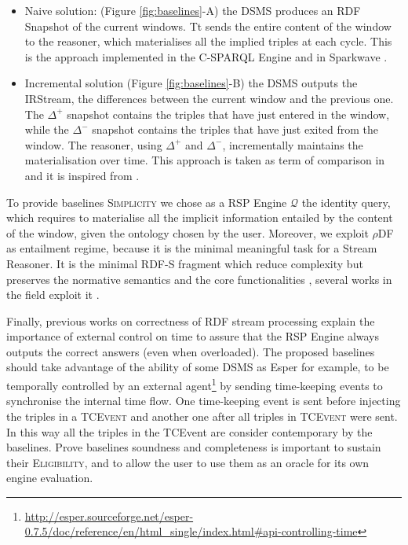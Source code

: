 \begin{itemize}
\item Naive solution: (Figure \ref{fig:baselines}-A) the DSMS produces an RDF Snapshot of the current windows. Tt sends the entire content of the window to the reasoner, which materialises all the implied triples at each cycle. This is the approach implemented in the C-SPARQL Engine \cite{DBLP:journals/sigmod/BarbieriBCVG10} and in Sparkwave \cite{DBLP:conf/debs/KomazecCF12}.
\item Incremental solution (Figure \ref{fig:baselines}-B) the DSMS outputs the IRStream, the differences between the current window and the previous one. The $\Delta^{+}$ snapshot contains the triples that have just entered in the window, while the $\Delta^{-}$ snapshot contains the triples that have just exited from the window. The reasoner, using $\Delta^{+}$ and $\Delta^{-}$, incrementally maintains the materialisation over time. This approach is taken as term of comparison in \cite{DellAglio2014} and it is inspired from \cite{DBLP:conf/cikm/RenP11}.
\end{itemize}

To provide baselines \textsc{Simplicity} we chose as a RSP Engine $\mathcal{Q}$ the identity query, which requires to materialise all the implicit information entailed by the content of the window, given the ontology chosen by the user. Moreover, we  exploit $\rho$DF as entailment regime, because it is the minimal meaningful task for a Stream Reasoner. It is the minimal RDF-S fragment which reduce complexity but preserves the normative semantics and the core functionalities \cite{DBLP:conf/esws/MunozPG07},  several works in the field exploit it  \cite{DBLP:conf/semweb/UrbaniMJHB13}.

Finally, previous works on correctness of RDF stream processing \cite{DBLP:conf/semweb/DellAglioCBCV13} explain the importance of external control on time to assure that the RSP Engine always outputs the correct answers (even when overloaded). The proposed baselines should take advantage of the ability of some DSMS as Esper for example, to be temporally controlled by an external agent\footnote{\url{http://esper.sourceforge.net/esper-0.7.5/doc/reference/en/html_single/index.html#api-controlling-time}} by sending time-keeping events to synchronise the internal time flow. One time-keeping event is sent before injecting the triples in a \textsc{TCEvent} and another one after all triples in \textsc{TCEvent}  were sent. In this way all the triples in the TCEvent are consider contemporary by the baselines. Prove baselines soundness and completeness is important to sustain their \textsc{Eligibility}, and to allow the user to use them as an oracle for its own engine evaluation.

